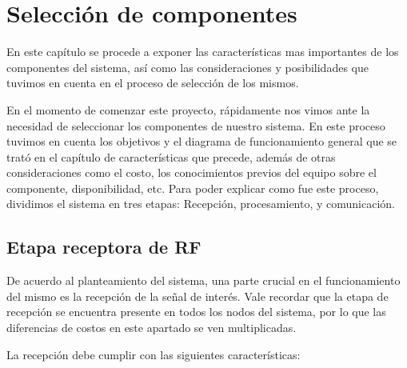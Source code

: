 
\chapter{Selección de componentes}
En este capítulo se procede a exponer las características mas importantes  de los componentes del sistema, así como las consideraciones y 
posibilidades que tuvimos en cuenta en el proceso de selección de los mismos. \par

En el momento de comenzar este proyecto, rápidamente nos vimos ante la necesidad de seleccionar los componentes de nuestro sistema. 
En este proceso tuvimos en cuenta los objetivos y el diagrama de funcionamiento general que se trató en el capítulo de características que precede,
además de otras consideraciones como el costo, los conocimientos previos del equipo sobre el componente, disponibilidad, etc. 
Para poder explicar como fue este proceso, dividimos el sistema en tres etapas: Recepción, procesamiento, y comunicación.

\section{Etapa receptora de RF} \par
De acuerdo al planteamiento del sistema, una parte crucial en el funcionamiento del mismo es la recepción de la señal de interés.
Vale recordar que la etapa de recepción se encuentra presente en todos los nodos del sistema, por lo que las diferencias de costos
en este apartado se ven multiplicadas.\par
La recepción debe cumplir con las siguientes características:

